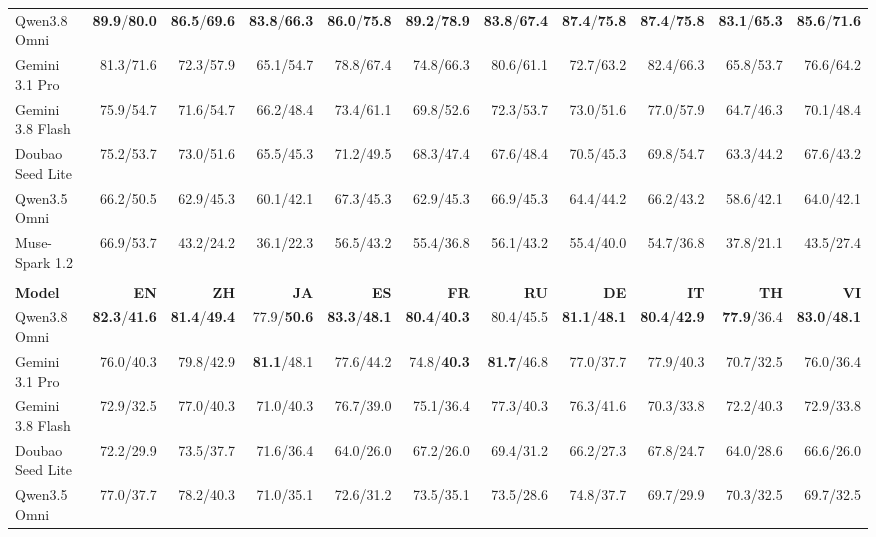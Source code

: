 \begin{table}[p]
\begin{tabular*}{\linewidth}{@{}l@{\hspace{3pt}\extracolsep{\fill}}*{10}{r}@{}}
\midrule
Qwen3.8 Omni & \textbf{89.9}/\textbf{80.0} & \textbf{86.5}/\textbf{69.6} & \textbf{83.8}/\textbf{66.3} & \textbf{86.0}/\textbf{75.8} & \textbf{89.2}/\textbf{78.9} & \textbf{83.8}/\textbf{67.4} & \textbf{87.4}/\textbf{75.8} & \textbf{87.4}/\textbf{75.8} & \textbf{83.1}/\textbf{65.3} & \textbf{85.6}/\textbf{71.6} \\
Gemini 3.1 Pro & 81.3/71.6 & 72.3/57.9 & 65.1/54.7 & 78.8/67.4 & 74.8/66.3 & 80.6/61.1 & 72.7/63.2 & 82.4/66.3 & 65.8/53.7 & 76.6/64.2 \\
Gemini 3.8 Flash & 75.9/54.7 & 71.6/54.7 & 66.2/48.4 & 73.4/61.1 & 69.8/52.6 & 72.3/53.7 & 73.0/51.6 & 77.0/57.9 & 64.7/46.3 & 70.1/48.4 \\
Doubao Seed Lite & 75.2/53.7 & 73.0/51.6 & 65.5/45.3 & 71.2/49.5 & 68.3/47.4 & 67.6/48.4 & 70.5/45.3 & 69.8/54.7 & 63.3/44.2 & 67.6/43.2 \\
Qwen3.5 Omni & 66.2/50.5 & 62.9/45.3 & 60.1/42.1 & 67.3/45.3 & 62.9/45.3 & 66.9/45.3 & 64.4/44.2 & 66.2/43.2 & 58.6/42.1 & 64.0/42.1 \\
Muse-Spark 1.2 & 66.9/53.7 & 43.2/24.2 & 36.1/22.3 & 56.5/43.2 & 55.4/36.8 & 56.1/43.2 & 55.4/40.0 & 54.7/36.8 & 37.8/21.1 & 43.5/27.4 \\
\addlinespace[3pt]
\midrule
\multicolumn{11}{@{}l}{\textbf{(c) Self Coherence (SC)}} \\
\textbf{Model} & \textbf{EN} & \textbf{ZH} & \textbf{JA} & \textbf{ES} & \textbf{FR} & \textbf{RU} & \textbf{DE} & \textbf{IT} & \textbf{TH} & \textbf{VI} \\
\midrule
Qwen3.8 Omni & \textbf{82.3}/\textbf{41.6} & \textbf{81.4}/\textbf{49.4} & 77.9/\textbf{50.6} & \textbf{83.3}/\textbf{48.1} & \textbf{80.4}/\textbf{40.3} & 80.4/45.5 & \textbf{81.1}/\textbf{48.1} & \textbf{80.4}/\textbf{42.9} & \textbf{77.9}/36.4 & \textbf{83.0}/\textbf{48.1} \\
Gemini 3.1 Pro & 76.0/40.3 & 79.8/42.9 & \textbf{81.1}/48.1 & 77.6/44.2 & 74.8/\textbf{40.3} & \textbf{81.7}/46.8 & 77.0/37.7 & 77.9/40.3 & 70.7/32.5 & 76.0/36.4 \\
Gemini 3.8 Flash & 72.9/32.5 & 77.0/40.3 & 71.0/40.3 & 76.7/39.0 & 75.1/36.4 & 77.3/40.3 & 76.3/41.6 & 70.3/33.8 & 72.2/40.3 & 72.9/33.8 \\
Doubao Seed Lite & 72.2/29.9 & 73.5/37.7 & 71.6/36.4 & 64.0/26.0 & 67.2/26.0 & 69.4/31.2 & 66.2/27.3 & 67.8/24.7 & 64.0/28.6 & 66.6/26.0 \\
Qwen3.5 Omni & 77.0/37.7 & 78.2/40.3 & 71.0/35.1 & 72.6/31.2 & 73.5/35.1 & 73.5/28.6 & 74.8/37.7 & 69.7/29.9 & 70.3/32.5 & 69.7/32.5 \\

\end{tabular*}
\end{table}
